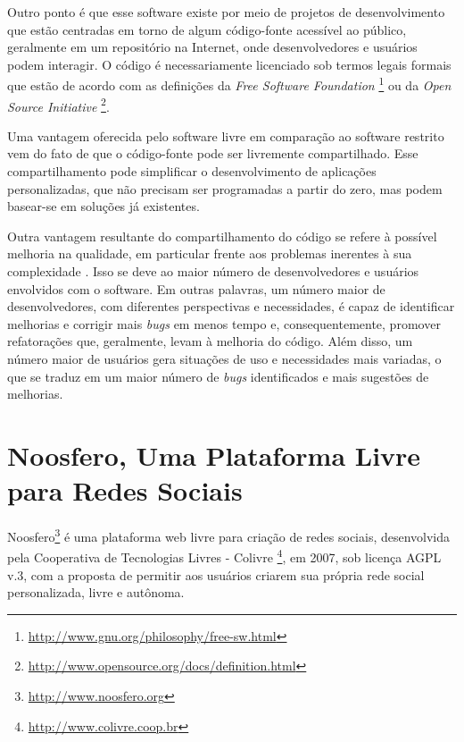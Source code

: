 Outro ponto é que esse software existe por meio de projetos de desenvolvimento
que estão centradas em torno de algum código-fonte acessível ao público,
geralmente em um repositório na Internet, onde desenvolvedores e usuários
podem interagir.
%
O código é necessariamente licenciado sob termos legais formais que estão de
acordo com as definições da \textit{Free Software Foundation}%
\footnote{\url{http://www.gnu.org/philosophy/free-sw.html}} ou da
\textit{Open Source Initiative}%
\footnote{\url{http://www.opensource.org/docs/definition.html}}.


Uma vantagem oferecida pelo software livre em comparação ao software
restrito vem do fato de que o código-fonte pode ser livremente compartilhado.
%
Esse compartilhamento pode simplificar o desenvolvimento de aplicações
personalizadas, que não precisam ser programadas a partir do zero, mas
podem basear-se em soluções já existentes.

Outra vantagem resultante do compartilhamento do código se refere
à possível melhoria na qualidade, em particular frente aos
problemas inerentes à sua complexidade \cite{CatedralBazzar}.
%
Isso se deve ao maior número de desenvolvedores e usuários envolvidos
com o software. Em outras palavras, um número maior de desenvolvedores, com diferentes
perspectivas e necessidades, é capaz de identificar melhorias e corrigir
mais \emph{bugs} em menos tempo e, consequentemente, promover refatorações que,
geralmente, levam à melhoria do código.
%
Além disso, um número maior de usuários gera situações de uso e
necessidades mais variadas, o que se traduz em um maior número
de \emph{bugs} identificados e mais sugestões de melhorias.


\section{Noosfero, Uma Plataforma Livre para Redes Sociais}
\label{noosfero-section}

Noosfero\footnote{\url{http://www.noosfero.org}}
é uma  plataforma web livre para criação de redes sociais, desenvolvida
pela Cooperativa de Tecnologias Livres - Colivre%
\footnote{\url{http://www.colivre.coop.br}},
em 2007, sob licença AGPL v.3, com a proposta de permitir aos usuários criarem sua
própria rede social personalizada, livre e autônoma.

